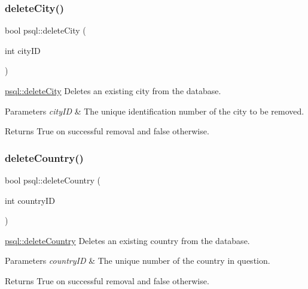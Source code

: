 \subsubsection{\texorpdfstring{delete\+City()}{deleteCity()}}
{\footnotesize\ttfamily bool psql\+::delete\+City (\begin{DoxyParamCaption}\item[{int}]{city\+ID }\end{DoxyParamCaption})}



\hyperlink{classpsql_aaffd42b26b635d9881daaf5fbf4fd62f}{psql\+::delete\+City} Deletes an existing city from the database. 


\begin{DoxyParams}{Parameters}
{\em city\+ID} & The unique identification number of the city to be removed. \\
\hline
\end{DoxyParams}
\begin{DoxyReturn}{Returns}
True on successful removal and false otherwise. 
\end{DoxyReturn}
\mbox{\label{classpsql_a914bf8701fbed4ff80edcd0d09c7c3fd}} 
\subsubsection{\texorpdfstring{delete\+Country()}{deleteCountry()}}
{\footnotesize\ttfamily bool psql\+::delete\+Country (\begin{DoxyParamCaption}\item[{int}]{country\+ID }\end{DoxyParamCaption})}



\hyperlink{classpsql_a914bf8701fbed4ff80edcd0d09c7c3fd}{psql\+::delete\+Country} Deletes an existing country from the database. 


\begin{DoxyParams}{Parameters}
{\em country\+ID} & The unique number of the country in question. \\
\hline
\end{DoxyParams}
\begin{DoxyReturn}{Returns}
True on successful removal and false otherwise. 
\end{DoxyReturn}
\mbox{\label{classpsql_a26fc592cfb9f484e1bee62af527f2b95}} 
